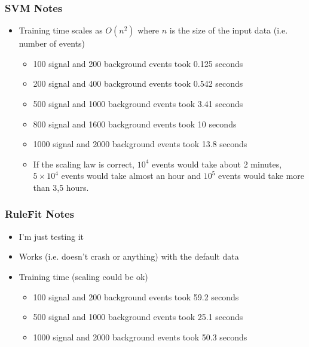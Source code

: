 \subsubsection{SVM Notes}
\begin{itemize}
\item Training time scales as $O(n^2)$ where $n$ is the size of the
  input data (i.e. number of events)
  \begin{itemize}
  \item 100 signal and 200 background events took 0.125 seconds
  \item 200 signal and 400 background events took 0.542 seconds
  \item 500 signal and 1000 background events took 3.41 seconds
  \item 800 signal and 1600 background events took 10 seconds
  \item 1000 signal and 2000 background events took 13.8 seconds
  \item If the scaling law is correct, $10^4$ events would take about 2
    minutes, $5\times 10^4$ events would take almost an hour and $10^5$
    events would take more than 3,5 hours.
  \end{itemize}
\end{itemize}

\subsubsection{RuleFit Notes}

\begin{itemize}
\item I'm just testing it
\item Works (i.e. doesn't crash or anything) with the default data
\item Training time (scaling could be ok)
  \begin{itemize}
  \item 100 signal and 200 background events took 59.2 seconds
  \item 500 signal and 1000 background events took 25.1 seconds
  \item 1000 signal and 2000 background events took 50.3 seconds
  \end{itemize}
\end{itemize}